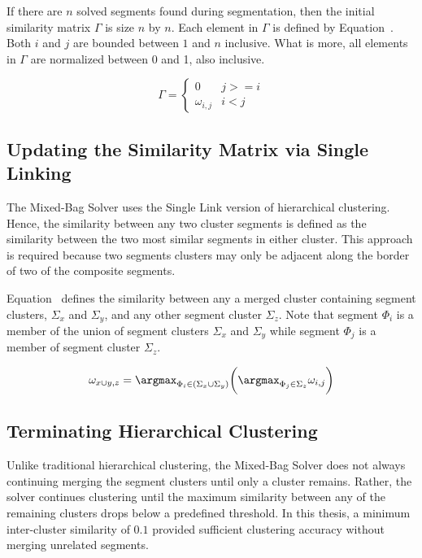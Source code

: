 If there are $n$ solved segments found during segmentation, then the initial similarity matrix $\Gamma$ is size $n$ by $n$.  Each element in $\Gamma$ is defined by Equation~.  Both $i$ and $j$ are bounded between $1$ and $n$ inclusive.  What is more, all elements in $\Gamma$ are normalized between 0 and 1, also inclusive.

\begin{equation} \label{eq:similarityMatrix}
\Gamma = \begin{cases} 
	0 & j >= i
\\
	\omega_{i,j} & i < j
\end{cases} 
\end{equation}

\subsection{Updating the Similarity Matrix via Single Linking}

The Mixed-Bag Solver uses the Single Link version of hierarchical clustering.  Hence, the similarity between any two cluster segments is defined as the similarity between the two most similar segments in either cluster.  This approach is required because two segments clusters may only be adjacent along the border of two of the composite segments.  

Equation~ defines the similarity between any a merged cluster containing segment clusters, $\Sigma_x$ and $\Sigma_y$, and any other segment cluster $\Sigma_z$.  Note that segment $\Phi_i$ is a member of the union of segment clusters $\Sigma_x$ and $\Sigma_y$ while segment $\Phi_j$ is a member of segment cluster $\Sigma_z$.

\begin{equation} \label{eq:segmentClusterMerge}
	\omega_{x \cup y,z} = \argmax_{\Phi_i \in (\Sigma_x \cup \Sigma_y)} \bigg( \argmax_{\Phi_j \in \Sigma_z} \omega_{i,j} \bigg) 
\end{equation}

\subsection{Terminating Hierarchical Clustering}

Unlike traditional hierarchical clustering, the Mixed-Bag Solver does not always continuing merging the segment clusters  until only a cluster remains. Rather, the solver continues clustering until the maximum similarity between any of the remaining clusters drops below a predefined threshold.  In this thesis, a minimum inter-cluster similarity of $0.1$ provided sufficient clustering accuracy without merging unrelated segments.

